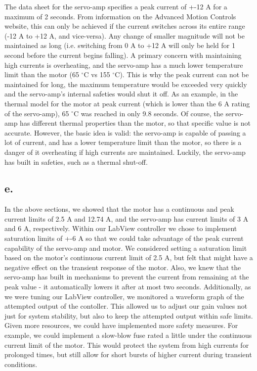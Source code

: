 \documentclass{article}
\theoremstyle{plain}
\theoremstyle{definition}
\theoremstyle{remark}
\begin{document}
The data sheet for the servo-amp specifies a peak current of +-12 A for a maximum of 2 seconds. From information on the Advanced Motion Controls website, this can only be achieved if the current switches across its entire range (-12 A to +12 A, and vice-versa). Any change of smaller magnitude will not be maintained as long (i.e. switching from 0 A to +12 A will only be held for 1 second before the current begins falling). A primary concern with maintaining high currents is overheating, and the servo-amp has a much lower temperature limit than the motor (65 $^\circ$C vs 155 $^\circ$C). This is why the peak current can not be maintained for long, the maximum temperature would be exceeded very quickly and the servo-amp's internal safeties would shut it off. As an example, in the thermal model for the motor at peak current (which is lower than the 6 A rating of the servo-amp), 65 $^\circ$C was reached in only 9.8 seconds. Of course, the servo-amp has different thermal properties than the motor, so that specific value is not accurate. However, the basic idea is valid: the servo-amp is capable of passing a lot of current, and has a lower temperature limit than the motor, so there is a danger of it overheating if high currents are maintained. Luckily, the servo-amp has built in safeties, such as a thermal shut-off.   

\subsection*{e.}
In the above sections, we showed that the motor has a continuous and peak current limits of 2.5 A and 12.74 A, and the servo-amp  has current limits of 3 A and 6 A, respectively. Within our LabView controller we chose to implement saturation limits of +-6 A so that we could take advantage of the peak current capability of the servo-amp and motor. We considered setting a saturation limit based on the motor's continuous current limit of 2.5 A, but felt that might have a negative effect on the transient response of the motor. Also, we knew that the servo-amp has built in mechanisms to prevent the current from remaining at the peak value - it automatically lowers it after at most two seconds. Additionally, as we were tuning our LabView controller, we monitored a waveform graph of the attempted output of the contoller. This allowed us to adjust our gain values not just for system stability, but also to keep the attempted output within safe limits. Given more resources, we could have implemented more safety measures. For example, we could implement a slow-blow fuse rated a little under the continuous current limit of the motor. This would protect the system from high currents for prolonged times, but still allow for short bursts of higher current during transient conditions.
\end{document}
